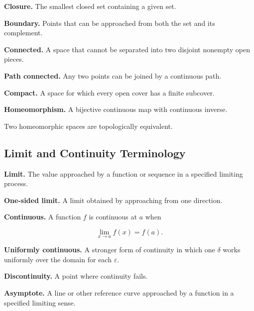 \textbf{Closure.}
The smallest closed set containing a given set.

\medskip

\textbf{Boundary.}
Points that can be approached from both the set and its complement.

\medskip

\textbf{Connected.}
A space that cannot be separated into two disjoint nonempty open pieces.

\medskip

\textbf{Path connected.}
Any two points can be joined by a continuous path.

\medskip

\textbf{Compact.}
A space for which every open cover has a finite subcover.

\medskip

\textbf{Homeomorphism.}
A bijective continuous map with continuous inverse.

Two homeomorphic spaces are topologically equivalent.

\subsection{Limit and Continuity Terminology}
\label{subsec:limit-continuity-terminology}

\textbf{Limit.}
The value approached by a function or sequence in a specified limiting
process.

\medskip

\textbf{One-sided limit.}
A limit obtained by approaching from one direction.

\medskip

\textbf{Continuous.}
A function \(f\) is continuous at \(a\) when

\[
\boxed{
\lim_{x\to a}f(x)=f(a).
}
\]

\medskip

\textbf{Uniformly continuous.}
A stronger form of continuity in which one \(\delta\) works uniformly over
the domain for each \(\varepsilon\).

\medskip

\textbf{Discontinuity.}
A point where continuity fails.

\medskip

\textbf{Asymptote.}
A line or other reference curve approached by a function in a specified
limiting sense.

